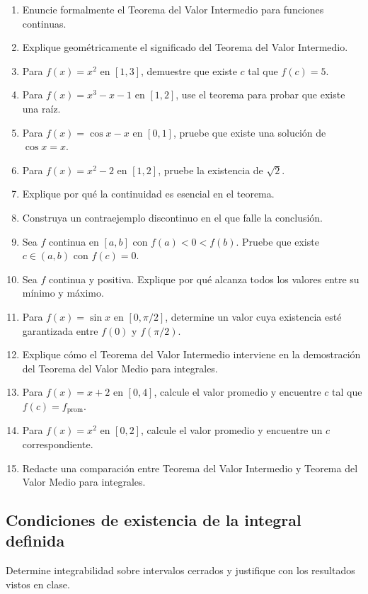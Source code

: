 \documentclass[12pt]{article}
\begin{document}
\begin{enumerate}[resume]
\item Enuncie formalmente el Teorema del Valor Intermedio para funciones continuas.
\item Explique geométricamente el significado del Teorema del Valor Intermedio.
\item Para $f(x)=x^2$ en $[1,3]$, demuestre que existe $c$ tal que $f(c)=5$.
\item Para $f(x)=x^3-x-1$ en $[1,2]$, use el teorema para probar que existe una raíz.
\item Para $f(x)=\cos x-x$ en $[0,1]$, pruebe que existe una solución de $\cos x=x$.
\item Para $f(x)=x^2-2$ en $[1,2]$, pruebe la existencia de $\sqrt2$.
\item Explique por qué la continuidad es esencial en el teorema.
\item Construya un contraejemplo discontinuo en el que falle la conclusión.
\item Sea $f$ continua en $[a,b]$ con $f(a)<0<f(b)$. Pruebe que existe $c\in(a,b)$ con $f(c)=0$.
\item Sea $f$ continua y positiva. Explique por qué alcanza todos los valores entre su mínimo y máximo.
\item Para $f(x)=\sin x$ en $[0,\pi/2]$, determine un valor cuya existencia esté garantizada entre $f(0)$ y $f(\pi/2)$.
\item Explique cómo el Teorema del Valor Intermedio interviene en la demostración del Teorema del Valor Medio para integrales.
\item Para $f(x)=x+2$ en $[0,4]$, calcule el valor promedio y encuentre $c$ tal que $f(c)=f_{\mathrm{prom}}$.
\item Para $f(x)=x^2$ en $[0,2]$, calcule el valor promedio y encuentre un $c$ correspondiente.
\item Redacte una comparación entre Teorema del Valor Intermedio y Teorema del Valor Medio para integrales.
\end{enumerate}
\subsection{Condiciones de existencia de la integral definida}
Determine integrabilidad sobre intervalos cerrados y justifique con los resultados vistos en clase.
\end{document}
